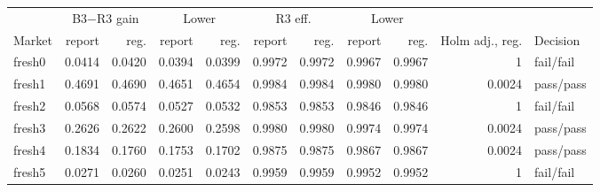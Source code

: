 \begin{tabular}{@{}lrrrrrrrrrl@{}}\toprule
 & \multicolumn{2}{c}{B3$-$R3 gain} & \multicolumn{2}{c}{Lower} & \multicolumn{2}{c}{R3 eff.} & \multicolumn{2}{c}{Lower} & & \\
Market & report & reg. & report & reg. & report & reg. & report & reg. & Holm adj., reg. & Decision \\\midrule
fresh0 & 0.0414 & 0.0420 & 0.0394 & 0.0399 & 0.9972 & 0.9972 & 0.9967 & 0.9967 & 1 & fail/fail \\
fresh1 & 0.4691 & 0.4690 & 0.4651 & 0.4654 & 0.9984 & 0.9984 & 0.9980 & 0.9980 & 0.0024 & pass/pass \\
fresh2 & 0.0568 & 0.0574 & 0.0527 & 0.0532 & 0.9853 & 0.9853 & 0.9846 & 0.9846 & 1 & fail/fail \\
fresh3 & 0.2626 & 0.2622 & 0.2600 & 0.2598 & 0.9980 & 0.9980 & 0.9974 & 0.9974 & 0.0024 & pass/pass \\
fresh4 & 0.1834 & 0.1760 & 0.1753 & 0.1702 & 0.9875 & 0.9875 & 0.9867 & 0.9867 & 0.0024 & pass/pass \\
fresh5 & 0.0271 & 0.0260 & 0.0251 & 0.0243 & 0.9959 & 0.9959 & 0.9952 & 0.9952 & 1 & fail/fail \\
\bottomrule\end{tabular}
